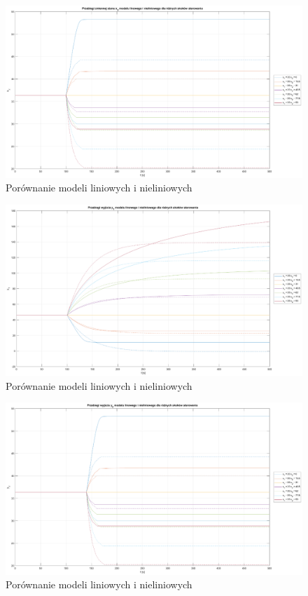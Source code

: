 \begin{figure}[H]
    \centering
    \includegraphics[scale=0.35]{images/x2_u1=20_u2=93_dt=0.1.eps}
    \caption{Porównanie modeli liniowych i nieliniowych}
\end{figure}

\begin{figure}[H]
    \centering
    \includegraphics[scale=0.35]{images/y1_u1=20_u2=93_dt=0.1.eps}
    \caption{Porównanie modeli liniowych i nieliniowych}
\end{figure}

\begin{figure}[H]
    \centering
    \includegraphics[scale=0.35]{images/y2_u1=20_u2=93_dt=0.1.eps}
    \caption{Porównanie modeli liniowych i nieliniowych}
\end{figure}

